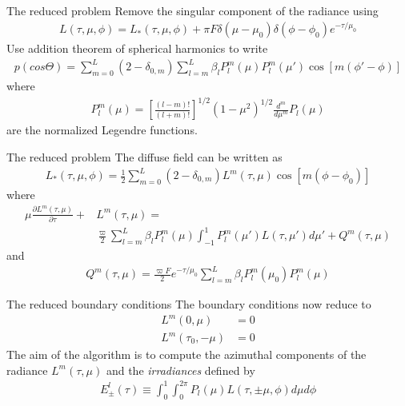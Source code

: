 \documentclass{beamer}
\newcommand{\pfrac}[2]{\frac{\partial #1}{\partial #2}}
\begin{document}
\begin{frame}{The reduced problem}
  Remove the singular component of the radiance using
  \begin{align}
    L(\tau,\mu,\phi) = L_*(\tau,\mu,\phi) 
    + \pi F \delta(\mu-\mu_0) \delta(\phi-\phi_0) e^{-\tau/\mu_0}
  \end{align}
  Use addition theorem of spherical harmonics to write
  \begin{align}
    p(cos\Theta) = \sum_{m=0}^L(2-\delta_{0,m})
    \sum_{l=m}^L\beta_l P_l^m(\mu) P_l^m(\mu')
    \cos[m(\phi'-\phi)]
  \end{align}
  where
  \begin{align}
    P_l^m(\mu) = \left[
      \frac{(l-m)!}{(l+m)!}
      \right]^{1/2}
      (1-\mu^2)^{1/2}\frac{d^m}{d\mu^m}
      P_l(\mu)
  \end{align}
  are the normalized Legendre functions.
\end{frame}

\begin{frame}{The reduced problem}
  The diffuse field can be written as
  \begin{align}
    L_*(\tau,\mu,\phi) = \frac{1}{2} \sum_{m=0}^L
    (2-\delta_{0,m})L^m(\tau,\mu) \cos[m(\phi-\phi_0)]
  \end{align}
  where
  \begin{align}
    \mu\pfrac{L^m(\tau,\mu)}{\tau} + &L^m(\tau,\mu)
    = \\
    &\frac{\varpi}{2}
    \sum_{l=m}^L \beta_l P_l^m(\mu)
    \int_{-1}^1
    P_l^m(\mu') L(\tau,\mu') d\mu'
    + Q^m(\tau,\mu)
  \end{align}
  and 
  \begin{align}
    Q^m(\tau,\mu) = \frac{\varpi F}{2}e^{-\tau/\mu_0}
    \sum_{l=m}^L \beta_l P^m_l(\mu_0) P_l^m(\mu)
  \end{align}
\end{frame}

\begin{frame}{The reduced boundary conditions}
  The boundary conditions now reduce to
  \begin{align}
    L^m(0, \mu) &= 0 \\
    L^m(\tau_0, -\mu) &= 0
  \end{align}
  The aim of the algorithm is to compute the azimuthal components of
  the radiance $L^m(\tau,\mu)$ and the \emph{irradiances} defined by
  \begin{align}
    E_\pm^l(\tau) \equiv \int_0^1 \int_0^{2\pi}
    P_l(\mu) L(\tau,\pm \mu, \phi) d\mu d\phi
  \end{align}
\end{frame}
\end{document}
